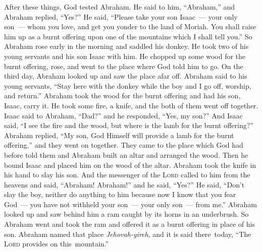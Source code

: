 
\begin{inparaenum}
   After these things, God tested Abraham. He said to him, ``Abraham,'' and Abraham replied, ``Yes?''%
   He said, ``Please take your son Isaac~--- your only son~--- whom you love, and get you yonder to the land of Moriah. You shall raise him up as a burnt offering upon one of the mountains which I shall tell you.''%
   So Abraham rose early in the morning and saddled his donkey. He took two of his young servants and his son Isaac with him. He chopped up some wood for the burnt offering, rose, and went to the place where God told him to go.%
   On the third day, Abraham looked up and saw the place afar off.%
   Abraham said to his young servants, ``Stay here with the donkey while the boy and I go off, worship, and return.''%
   Abraham took the wood for the burnt offering and had his son, Isaac, carry it. He took some fire, a knife, and the both of them went off together.%
   Isaac said to Abraham, ``Dad?'' and he responded, ``Yes, my son?'' And Isaac said, ``I see the fire and the wood, but where is the lamb for the burnt offering?''%
   Abraham replied, ``My son, God Himself will provide a lamb for the burnt offering,'' and they went on together.%
   They came to the place which God had before told them and Abraham built an altar and arranged the wood. Then he bound Isaac and placed him on the wood of the altar.%
   Abraham took the knife in his hand to slay his son.%
   And the messenger of the \textsc{Lord} called to him from the heavens and said, ``Abraham! Abraham!'' and he said, ``Yes?''%
   He said, ``Don't slay the boy, neither do anything to him because now I know that you fear God~--- you have not withheld your son~--- your only son~--- from me.''%
   Abraham looked up and saw behind him a ram caught by its horns in an underbrush. So Abraham went and took the ram and offered it as a burnt offering in place of his son.%
   Abraham named that place \textit{Jehovah-yireh}, and it is said there\understood\ today, ``The \textsc{Lord} provides on this\understood\ mountain.''%

\end{inparaenum}
